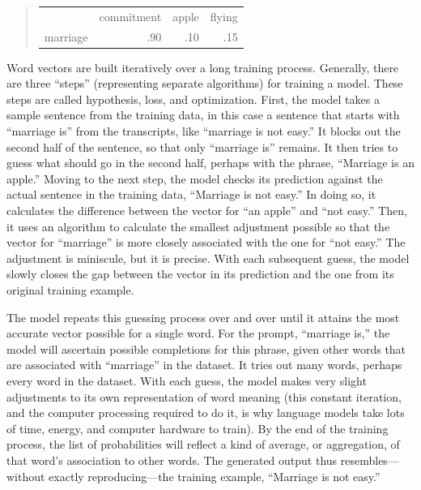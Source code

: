 \documentclass[11pt]{article}
\begin{document}
\begin{quote}
\begin{center}
\begin{tabular}{lrrr}
 & commitment & apple & flying\\[0pt]
marriage & .90 & .10 & .15\\[0pt]
\end{tabular}
\end{center}
\end{quote}

Word vectors are built iteratively over a long training process.
Generally, there are three “steps” (representing separate algorithms)
for training a model. These steps are called hypothesis, loss, and
optimization. First, the model takes a sample sentence from the
training data, in this case a sentence that starts with “marriage is”
from the transcripts, like “marriage is not easy.” It blocks out the
second half of the sentence, so that only “marriage is” remains. It
then tries to guess what should go in the second half, perhaps with
the phrase, “Marriage is an apple.” Moving to the next step, the model
checks its prediction against the actual sentence in the training
data, “Marriage is not easy.” In doing so, it calculates the
difference between the vector for “an apple” and “not easy.” Then, it
uses an algorithm to calculate the smallest adjustment possible so
that the vector for “marriage” is more closely associated with the one
for “not easy.” The adjustment is miniscule, but it is precise. With
each subsequent guess, the model slowly closes the gap between the
vector in its prediction and the one from its original training
example.

The model repeats this guessing process over and over until it attains
the most accurate vector possible for a single word. For the prompt,
“marriage is,” the model will ascertain possible completions for this
phrase, given other words that are associated with “marriage” in the
dataset. It tries out many words, perhaps every word in the dataset.
With each guess, the model makes very slight adjustments to its own
representation of word meaning (this constant iteration, and the
computer processing required to do it, is why language models take
lots of time, energy, and computer hardware to train). By the end of
the training process, the list of probabilities will reflect a kind of
average, or aggregation, of that word’s association to other words.
The generated output thus resembles—without exactly reproducing—the
training example, “Marriage is not easy.”
\end{document}
